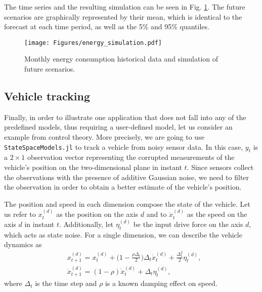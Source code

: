 \documentclass{juliacon}
\begin{document}
The time series and the resulting simulation can be seen in Fig. \ref{fig:energy_simulation}. The future scenarios are graphically represented by their mean, which is identical to the forecast at each time period, as well as the 5\% and 95\% quantiles.
%
\begin{figure}[h]
	\centering
	\texttt{[image: Figures/energy\_simulation.pdf]}
	\caption{Monthly energy consumption historical data and simulation of future scenarios.}
	\label{fig:energy_simulation}
\end{figure}

\subsection{Vehicle tracking}

Finally, in order to illustrate one application that does not fall into any of the predefined models, thus requiring a user-defined model, let us consider an example from control theory. More precisely, we are going to use \texttt{StateSpaceModels.jl} to track a vehicle from noisy sensor data. In this case, $y_t$ is a $2 \times 1$ observation vector representing the corrupted measurements of the vehicle's position on the two-dimensional plane in instant $t$. Since sensors collect the observations with the presence of additive Gaussian noise, we need to filter the observation in order to obtain a better estimate of the vehicle's position.

The position and speed in each dimension compose the state of the vehicle. Let us refer to $x_t^{(d)}$ as the position on the axis $d$ and to $\dot{x}^{(d)}_t$ as the speed on the axis $d$ in instant $t$. Additionally, let $\eta^{(d)}_t$ be the input drive force on the axis $d$, which acts as state noise. For a single dimension, we can describe the vehicle dynamics as 
\begin{equation}
\begin{aligned}
    & x_{t+1}^{(d)} = x_t^{(d)} + \Big( 1 - \frac{\rho \Delta_t}{2} \Big) \Delta_t \dot{x}^{(d)}_t + \frac{\Delta^2_t}{2} \eta_t^{(d)}, \\
    & \dot{x}^{(d)}_{t+1} = (1 - \rho) \dot{x}^{(d)}_{t} + \Delta_t \eta^{(d)}_t,
\end{aligned}\label{eq_control}
\end{equation}
where $\Delta_t$ is the time step and $\rho$ is a known damping effect on speed. 
\end{document}
